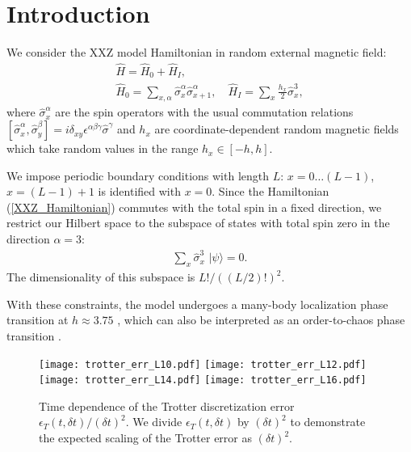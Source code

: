 \documentclass[10pt,amsmath,amssymb,twocolumn,superscriptaddress,groupedaddress,nofootinbib,aps,prd,twocolumn]{revtex4-1}
\newcommand{\lr}[1]{\left(#1\right)}
\newcommand{\lrs}[1]{\left[#1\right]}
\newcommand{\ket}[1]{ \, | #1 \rangle }
\begin{document}
\sloppy

\section{Introduction}
\label{sec:intro}

We consider the XXZ model Hamiltonian in random external magnetic field:
\begin{eqnarray}
\label{XXZ_Hamiltonian}
 \hat{H} = \hat{H}_0 + \hat{H}_I,
 \nonumber \\
 \hat{H}_0 = \sum\limits_{x,\alpha} \hat{\sigma}^{\alpha}_x \hat{\sigma}^{\alpha}_{x+1} ,
 \quad
 \hat{H}_I = \sum\limits_x \frac{h_x}{2} \hat{\sigma}^3_x ,
\end{eqnarray}
where $\hat{\sigma}^{\alpha}_x$ are the spin operators with the usual commutation relations $\lrs{\hat{\sigma}^{\alpha}_x, \hat{\sigma}^{\beta}_y} = i \delta_{x y} \epsilon^{\alpha\beta\gamma} \hat{\sigma}^{\gamma}$ and $h_x$ are coordinate-dependent random magnetic fields which take random values in the range $h_x \in \lrs{-h, h}$.

We impose periodic boundary conditions with length $L$: $x = 0 \ldots \lr{L-1}$, $x = \lr{L-1}+1$ is identified with $x = 0$. Since the Hamiltonian (\ref{XXZ_Hamiltonian}) commutes with the total spin in a fixed direction, we restrict our Hilbert space to the subspace of states with total spin zero in the direction $\alpha = 3$:
\begin{eqnarray}
\label{spin0_constraint}
 \sum\limits_{x} \hat{\sigma}^3_x \, \ket{\psi} = 0 .
\end{eqnarray}
The dimensionality of this subspace is $L!/\lr{\lr{L/2}!}^2$.

With these constraints, the model undergoes a many-body localization phase transition at $h \approx 3.75$ \cite{Luitz:1411.0660}, which can also be interpreted as an order-to-chaos phase transition \cite{Hanada:1803.08050}.

\begin{figure*}[h!pb]
  \centering
  \texttt{[image: trotter\_err\_L10.pdf]}
  \texttt{[image: trotter\_err\_L12.pdf]}\\
  \texttt{[image: trotter\_err\_L14.pdf]}
  \texttt{[image: trotter\_err\_L16.pdf]}\\
  \caption{Time dependence of the Trotter discretization error $\epsilon_T\lr{t, {\delta t}}/\lr{\delta t}^2$. We divide $\epsilon_T\lr{t, {\delta t}}$ by $\lr{\delta t}^2$ to demonstrate the expected scaling of the Trotter error as $\lr{\delta t}^2$.}
  \label{fig:trotter_err}
\end{figure*}
\end{document}
